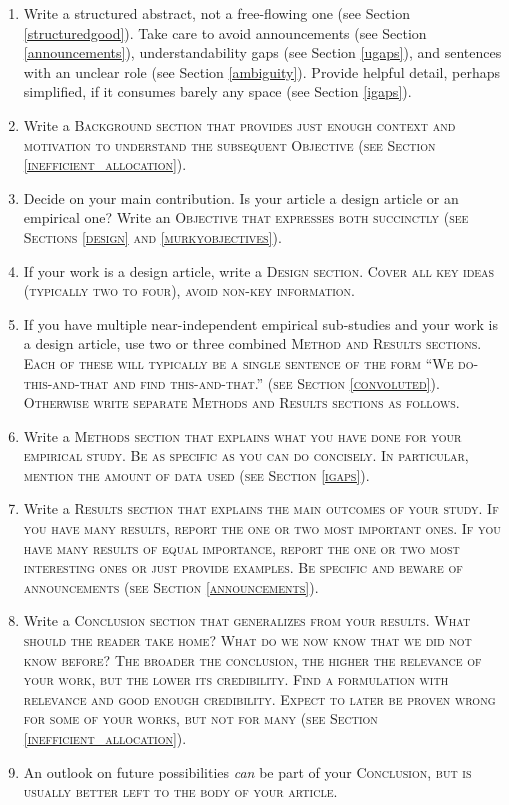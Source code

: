 \documentclass[10pt,journal,compsoc]{IEEEtran}
\newcommand{\Sah}[1]{\bgroup\scshape #1\egroup}  %
\begin{document}
\begin{enumerate}
  \item Write a structured abstract, not a free-flowing one 
    (see Section \ref{structuredgood}).
    Take care to avoid announcements (see Section \ref{announcements}),
    understandability gaps (see Section \ref{ugaps}),
    and sentences with an unclear role (see Section \ref{ambiguity}).
    Provide helpful detail, perhaps simplified, if it consumes barely any space
    (see Section \ref{igaps}).
  \item Write a \Sah{Background} section that provides just enough context
    and motivation to understand the subsequent \Sah{Objective} 
    (see Section \ref{inefficient_allocation}).
  \item Decide on your main contribution. 
    Is your article a design article or an empirical one?
    Write an \Sah{Objective} that expresses both succinctly 
    (see Sections \ref{design} and \ref{murkyobjectives}).
  \item If your work is a design article, 
    write a \Sah{Design} section.
    Cover all key ideas (typically two to four), avoid non-key information.
  \item If you have multiple near-independent empirical sub-studies and
    your work is a design article,
    use two or three combined \Sah{Method and Results} sections.
    Each of these will typically be a single sentence of the form
    ``We do-this-and-that and find this-and-that.''
    (see Section \ref{convoluted}).
    Otherwise write separate \Sah{Methods} and \Sah{Results} sections
    as follows.
  \item Write a \Sah{Methods} section that explains what you have done
    for your empirical study. 
    Be as specific as you can do concisely.
    In particular, mention the amount of data used (see Section \ref{igaps}).
  \item Write a \Sah{Results} section that explains the main outcomes
    of your study.
    If you have many results, report the one or two most important ones.
    If you have many results of equal importance, report the 
    one or two most interesting ones or just provide examples.
    Be specific and beware of announcements (see Section \ref{announcements}).
  \item Write a \Sah{Conclusion} section that generalizes from your results.
    What should the reader take home?
    What do we now know that we did not know before?
    The broader the conclusion, the higher the relevance of your work,
    but the lower its credibility. 
    Find a formulation with relevance and good enough credibility.
    Expect to later be proven wrong for some of your works, but not for many
    (see Section \ref{inefficient_allocation}).
  \item An outlook on future possibilities \emph{can} be part of your \Sah{Conclusion},
    but is usually better left to the body of your article.
\end{enumerate}
\end{document}
